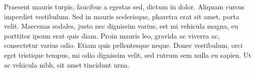\begin{center}
\begin{minipage}{.9\textwidth}
Praesent mauris turpis, faucibus a egestas sed, dictum in dolor. Aliquam cursus imperdiet vestibulum. Sed in mauris scelerisque, pharetra erat sit amet, porta velit. Maecenas sodales, justo nec dignissim varius, est mi vehicula magna, eu porttitor ipsum erat quis diam. Proin mauris leo, gravida ac viverra ac, consectetur varius odio. Etiam quis pellentesque neque. Donec vestibulum, orci eget tristique tempus, mi odio dignissim velit, sed rutrum sem nulla eu sapien. Ut ac vehicula nibh, sit amet tincidunt urna.

\end{minipage}
\end{center}


\cleardoublepage